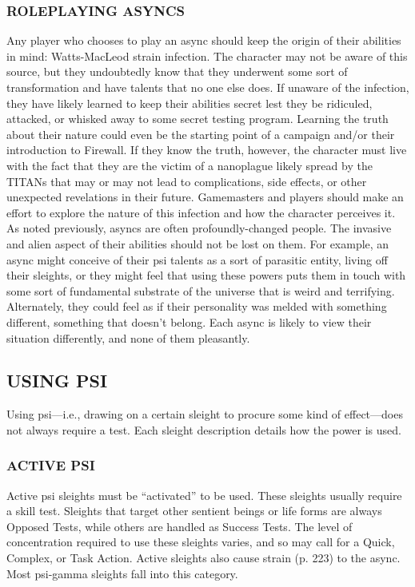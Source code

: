 \subsubsection{ROLEPLAYING ASYNCS}

Any player who chooses to play an async should keep
the origin of their abilities in mind: Watts-MacLeod
strain infection. The character may not be aware of
this source, but they undoubtedly know that they underwent
some sort of transformation and have talents
that no one else does. If unaware of the infection, they
have likely learned to keep their abilities secret lest
they be ridiculed, attacked, or whisked away to some
secret testing program. Learning the truth about their
nature could even be the starting point of a campaign
and/or their introduction to Firewall. If they know the
truth, however, the character must live with the fact
that they are the victim of a nanoplague likely spread
by the TITANs that may or may not lead to complications,
side effects, or other unexpected revelations in
their future.
Gamemasters and players should make an effort
to explore the nature of this infection and how the
character perceives it. As noted previously, asyncs are
often profoundly-changed people. The invasive and
alien aspect of their abilities should not be lost on
them. For example, an async might conceive of their
psi talents as a sort of parasitic entity, living off their
sleights, or they might feel that using these powers
puts them in touch with some sort of fundamental
substrate of the universe that is weird and terrifying.
Alternately, they could feel as if their personality was
melded with something different, something that
doesn’t belong. Each async is likely to view their situation
differently, and none of them pleasantly.

\subsection{USING PSI}

Using psi—i.e., drawing on a certain sleight to procure
some kind of effect—does not always require a
test. Each sleight description details how the power
is used.

\subsubsection{ACTIVE PSI}

Active psi sleights must be “activated” to be used.
These sleights usually require a skill test. Sleights that
target other sentient beings or life forms are always
Opposed Tests, while others are handled as Success
Tests. The level of concentration required to use these
sleights varies, and so may call for a Quick, Complex,
or Task Action. Active sleights also cause strain (p.
223) to the async. Most psi-gamma sleights fall into
this category.

